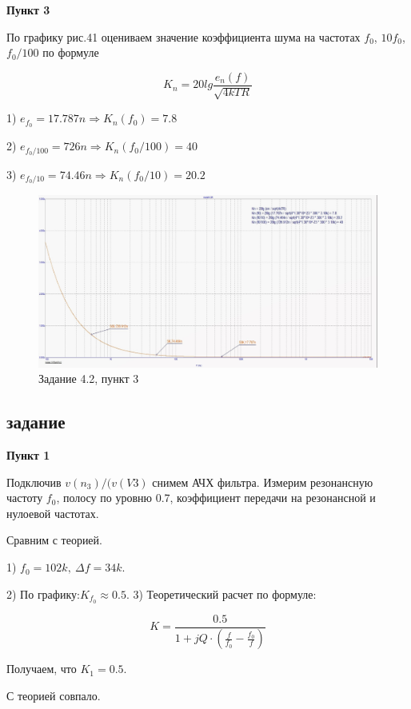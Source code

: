 \documentclass[a4paper, 14pt]{extarticle}%
\begin{document}
\textbf{Пункт 3}



По графику рис.41 оцениваем значение коэффициента шума на частотах $f_0$, $10f_0$, $f_0/100$ по формуле


\[  K_n = 20lg\frac{e_n(f)}{\sqrt{4kTR}}   \]


1) $e_{f_0}= 17.787n \Rightarrow K_n(f_0) = 7.8 $

2) $e_{f_0/100}= 726n \Rightarrow K_n(f_0/100) = 40 $

3) $e_{f_0/10}= 74.46n \Rightarrow K_n(f_0/10) = 20.2 $


\begin{figure}[h!]
			\centering
			\includegraphics[width=1.1\linewidth]{4/4_2_1.jpg}
			\caption{Задание 4.2, пункт 3}
			\label{A}
\end{figure}



\subsection{задание}

\textbf{Пункт 1}


Подключив $v(n_3)/(v(V3)$ снимем АЧХ фильтра. Измерим резонансную частоту $f_0$, полосу по уровню 0.7, коэффициент передачи на резонансной и нулоевой частотах.

Сравним с теорией.

1) $f_0 = 102k, \: \Delta f = 34k$.

2) По графику:$K_{f_0} \approx 0.5$.
3) Теоретический расчет по формуле:

\[ K = \frac{0.5}{1 + jQ\cdot(\frac{f}{f_0} - \frac{f_0}{f})}\]

Получаем, что $K_1 = 0.5$.

С теорией совпало.
\end{document}
